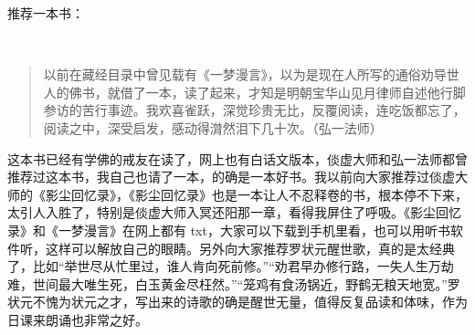 推荐一本书：

\begin{book}[《一梦漫言》]~\\
    \begin{quote}
        以前在藏经目录中曾见载有《一梦漫言》，以为是现在人所写的通俗劝导世人的佛书，就借了一本，读了起来，才知是明朝宝华山见月律师自述他行脚参访的苦行事迹。我欢喜雀跃，深觉珍贵无比，反覆阅读，连吃饭都忘了，阅读之中，深受启发，感动得潸然泪下几十次。（弘一法师）
    \end{quote}
    这本书已经有学佛的戒友在读了，网上也有白话文版本，倓虚大师和弘一法师都曾推荐过这本书，我自己也请了一本，的确是一本好书。我以前向大家推荐过倓虚大师的《影尘回忆录》，《影尘回忆录》也是一本让人不忍释卷的书，根本停不下来，太引人入胜了，特别是倓虚大师入冥还阳那一章，看得我屏住了呼吸。《影尘回忆录》和《一梦漫言》在网上都有 txt，大家可以下载到手机里看，也可以用听书软件听，这样可以解放自己的眼睛。另外向大家推荐罗状元醒世歌，真的是太经典了，比如“举世尽从忙里过，谁人肯向死前修。”“劝君早办修行路，一失人生万劫难，世间最大唯生死，白玉黄金尽枉然。”“笼鸡有食汤锅近，野鹤无粮天地宽。”罗状元不愧为状元之才，写出来的诗歌的确是醒世无量，值得反复品读和体味，作为日课来朗诵也非常之好。
\end{book}
